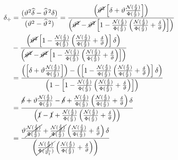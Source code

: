 \documentclass[11pt,twoside,spanish]{report} %
\begin{document}
\begin{equation}
	\begin{split}
		\delta_{\div} &= \frac{(\vartheta^2\widehat{\delta} - \widehat{\vartheta}^{\,2}\delta)}{(\vartheta^2 - \widehat{\vartheta}^{\,2})}
		= \frac{\left(\cancel{\vartheta^2} \left[\delta+\vartheta\frac{\mathcal{N}(\frac{\delta}{\vartheta})}{\Phi(\frac{\delta}{\vartheta})}\right]  \right)}{\left(\cancel{\vartheta^2}- \cancel{\vartheta^2}\left[1-\frac{\mathcal{N}(\frac{\delta}{\vartheta})}{\Phi(\frac{\delta}{\vartheta})}\left(\frac{\mathcal{N}(\frac{\delta}{\vartheta})}{\Phi(\frac{\delta}{\vartheta})}+ \frac{\delta}{\vartheta}\right)\right] \right)}\\
		&- \frac{\left(\cancel{ \vartheta^2}\left[1-\frac{\mathcal{N}(\frac{\delta}{\vartheta})}{\Phi(\frac{\delta}{\vartheta})}\left(\frac{\mathcal{N}(\frac{\delta}{\vartheta})}{\Phi(\frac{\delta}{\vartheta})}+ \frac{\delta}{\vartheta}\right)\right] \delta\right)}{\left(\cancel{\vartheta^2}- \cancel{\vartheta^2}\left[1-\frac{\mathcal{N}(\frac{\delta}{\vartheta})}{\Phi(\frac{\delta}{\vartheta})}\left(\frac{\mathcal{N}(\frac{\delta}{\vartheta})}{\Phi(\frac{\delta}{\vartheta})}+ \frac{\delta}{\vartheta}\right)\right] \right)}\\
		&=\frac{\left(\left[\delta+\vartheta\frac{\mathcal{N}(\frac{\delta}{\vartheta})}{\Phi(\frac{\delta}{\vartheta})}\right]  \right)-\left(\left[1-\frac{\mathcal{N}(\frac{\delta}{\vartheta})}{\Phi(\frac{\delta}{\vartheta})}\left(\frac{\mathcal{N}(\frac{\delta}{\vartheta})}{\Phi(\frac{\delta}{\vartheta})}+ \frac{\delta}{\vartheta}\right)\right] \delta\right)}{\left(1- \left[1-\frac{\mathcal{N}(\frac{\delta}{\vartheta})}{\Phi(\frac{\delta}{\vartheta})}\left(\frac{\mathcal{N}(\frac{\delta}{\vartheta})}{\Phi(\frac{\delta}{\vartheta})}+ \frac{\delta}{\vartheta}\right)\right] \right)} \\
		&=   \frac{\cancel{\delta}+\vartheta\frac{\mathcal{N}(\frac{\delta}{\vartheta})}{\Phi(\frac{\delta}{\vartheta})} -\cancel{\delta}+\frac{\mathcal{N}(\frac{\delta}{\vartheta})}{\Phi(\frac{\delta}{\vartheta})}\left(\frac{\mathcal{N}(\frac{\delta}{\vartheta})}{\Phi(\frac{\delta}{\vartheta})}+ \frac{\delta}{\vartheta}\right) \delta}{\left(\cancel{1}- \cancel{1}+\frac{\mathcal{N}(\frac{\delta}{\vartheta})}{\Phi(\frac{\delta}{\vartheta})}\left(\frac{\mathcal{N}(\frac{\delta}{\vartheta})}{\Phi(\frac{\delta}{\vartheta})}+ \frac{\delta}{\vartheta}\right) \right)}\\
		&=   \frac{\vartheta\cancel{\frac{\mathcal{N}(\frac{\delta}{\vartheta})}{\Phi(\frac{\delta}{\vartheta})}} +\cancel{\frac{\mathcal{N}(\frac{\delta}{\vartheta})}{\Phi(\frac{\delta}{\vartheta})}}\left(\frac{\mathcal{N}(\frac{\delta}{\vartheta})}{\Phi(\frac{\delta}{\vartheta})}+ \frac{\delta}{\vartheta}\right) \delta}  {\left(\cancel{\frac{\mathcal{N}(\frac{\delta}{\vartheta})}{\Phi(\frac{\delta}{\vartheta_1})}}\left(\frac{\mathcal{N}(\frac{\delta}{\vartheta})}{\Phi(\frac{\delta}{\vartheta})}+ \frac{\delta}{\vartheta}\right) \right)}

\end{split}
\end{equation}
\end{document}
